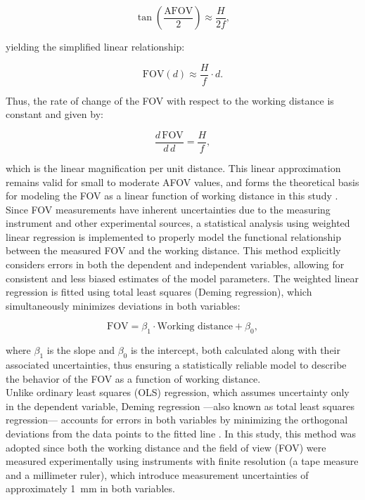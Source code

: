 \begin{equation}
\tan\left(\frac{\text{AFOV}}{2}\right) \approx \frac{H}{2f},
\end{equation}

\noindent
yielding the simplified linear relationship:

\begin{equation}
\text{FOV}(d) \approx \frac{H}{f} \cdot d.
\end{equation}

\noindent
Thus, the rate of change of the FOV with respect to the working distance is constant and given by:

\begin{equation}
\frac{d\,\text{FOV}}{d\,d} = \frac{H}{f},
\end{equation}

\noindent
which is the linear magnification per unit distance. This linear approximation remains valid for small to moderate AFOV values, and forms the theoretical basis for modeling the FOV as a linear function of working distance in this study \cite{Hecht2002Optics}.\\


\noindent Since FOV measurements have inherent uncertainties due to the measuring instrument and other experimental sources, a statistical analysis using weighted linear regression is implemented to properly model the functional relationship between the measured FOV and the working distance. This method explicitly considers errors in both the dependent and independent variables, allowing for consistent and less biased estimates of the model parameters. The weighted linear regression is fitted using total least squares (Deming regression), which simultaneously minimizes deviations in both variables:

\begin{equation}
\text{FOV} = \beta_1 \cdot \text{Working distance} + \beta_0,
\label{eq:regresion_lineal}
\end{equation}

\noindent where $\beta_1$ is the slope and $\beta_0$ is the intercept, both calculated along with their associated uncertainties, thus ensuring a statistically reliable model to describe the behavior of the FOV as a function of working distance.\\

\noindent Unlike ordinary least squares (OLS) regression, which assumes uncertainty only in the dependent variable, Deming regression ---also known as total least squares regression--- accounts for errors in both variables by minimizing the orthogonal deviations from the data points to the fitted line \cite{Deming1943ErrorsInVariables}. In this study, this method was adopted since both the working distance and the field of view (FOV) were measured experimentally using instruments with finite resolution (a tape measure and a millimeter ruler), which introduce measurement uncertainties of approximately \SI{1}{\milli\meter} in both variables. \\

